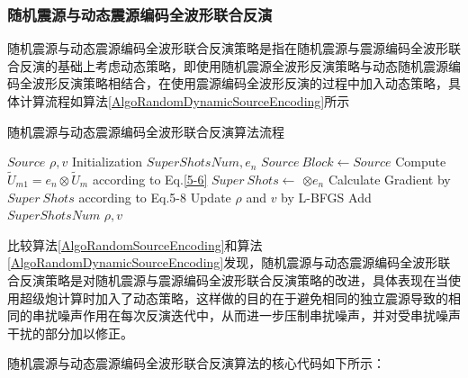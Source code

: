 \documentclass[12pt]{article}
\renewcommand{\algorithmicrequire}{\textbf{参数说明:}}
\renewcommand{\algorithmicensure}{\textbf{输出:}}
\begin{document}
\subsubsection{随机震源与动态震源编码全波形联合反演}
随机震源与动态震源编码全波形联合反演策略是指在随机震源与震源编码全波形联合反演的基础上考虑动态策略，即使用随机震源全波形反演策略与动态随机震源编码全波形反演策略相结合，在使用震源编码全波形反演的过程中加入动态策略，具体计算流程如算法\ref{AlgoRandomDynamicSourceEncoding}所示
\begin{algorithm}[H]
\caption{随机震源与动态震源编码全波形联合反演算法流程}
\label{AlgoRandomDynamicSourceEncoding}
\renewcommand{\algorithmicrequire}{\textbf{输入:}}
\renewcommand{\algorithmicensure}{\textbf{输出:}}
\begin{algorithmic}[1]
\Require
$Source$
\Ensure
$\rho,v$
\State Initialization $SuperShotsNum,e_n$
\State $Source\ Block \gets Source$
\State Compute $\tilde{U}_{m1}=e_n \otimes \tilde{U}_m$ according to Eq.\ref{5-6}
\State $Super\ Shots \gets$  $\otimes e_n$
\State Calculate Gradient by $Super\ Shots$ according to Eq.5-8
\State Update $\rho$ and $v$ by L-BFGS
\EndFor
\EndFor
\State Add $SuperShotsNum$
\EndFor
\State \Return $\rho,v$
\end{algorithmic}
\end{algorithm}
\par
比较算法\ref{AlgoRandomSourceEncoding}和算法\ref{AlgoRandomDynamicSourceEncoding}发现，随机震源与动态震源编码全波形联合反演策略是对随机震源与震源编码全波形联合反演策略的改进，具体表现在当使用超级炮计算时加入了动态策略，这样做的目的在于避免相同的独立震源导致的相同的串扰噪声作用在每次反演迭代中，从而进一步压制串扰噪声，并对受串扰噪声干扰的部分加以修正。
\par
随机震源与动态震源编码全波形联合反演算法的核心代码如下所示：
\end{document}
